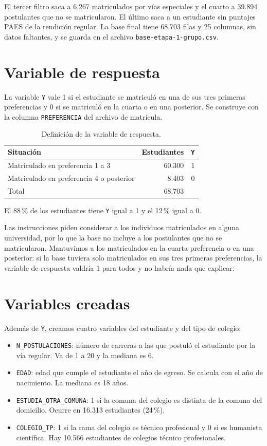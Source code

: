 \documentclass[11pt,letterpaper]{article}
\begin{document}
El tercer filtro saca a 6.267 matriculados por vías especiales y el cuarto a 39.894 postulantes que no se matricularon. El último saca a un estudiante sin puntajes PAES de la rendición regular. La base final tiene 68.703 filas y 25 columnas, sin datos faltantes, y se guarda en el archivo \texttt{base-etapa-1-grupo.csv}.

\section{Variable de respuesta}

La variable \texttt{Y} vale 1 si el estudiante se matriculó en una de sus tres primeras preferencias y 0 si se matriculó en la cuarta o en una posterior. Se construye con la columna \texttt{PREFERENCIA} del archivo de matrícula.

\begin{table}[h]
\centering
\begin{tabular}{lrr}
\toprule
Situación & Estudiantes & \texttt{Y} \\
\midrule
Matriculado en preferencia 1 a 3 & 60.300 & 1 \\
Matriculado en preferencia 4 o posterior & 8.403 & 0 \\
\midrule
Total & 68.703 & \\
\bottomrule
\end{tabular}
\caption{Definición de la variable de respuesta.}
\end{table}

El 88\,\% de los estudiantes tiene \texttt{Y} igual a 1 y el 12\,\% igual a 0.

Las instrucciones piden considerar a los individuos matriculados en alguna universidad, por lo que la base no incluye a los postulantes que no se matricularon. Mantuvimos a los matriculados en la cuarta preferencia o en una posterior: si la base tuviera solo matriculados en sus tres primeras preferencias, la variable de respuesta valdría 1 para todos y no habría nada que explicar.

\section{Variables creadas}

Además de \texttt{Y}, creamos cuatro variables del estudiante y del tipo de colegio:

\begin{itemize}
\item \texttt{N\_POSTULACIONES}: número de carreras a las que postuló el estudiante por la vía regular. Va de 1 a 20 y la mediana es 6.
\item \texttt{EDAD}: edad que cumple el estudiante el año de egreso. Se calcula con el año de nacimiento. La mediana es 18 años.
\item \texttt{ESTUDIA\_OTRA\_COMUNA}: 1 si la comuna del colegio es distinta de la comuna del domicilio. Ocurre en 16.313 estudiantes (24\,\%).
\item \texttt{COLEGIO\_TP}: 1 si la rama del colegio es técnico profesional y 0 si es humanista científica. Hay 10.566 estudiantes de colegios técnico profesionales.
\end{itemize}
\end{document}
